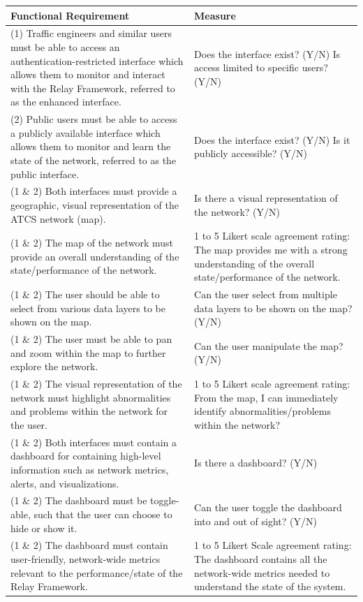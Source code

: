 \documentclass{article}
\begin{document}
\begin{longtable}[htbp!] {|p{6cm}|p{6cm}|}
\hline
\textbf{Functional Requirement} & \textbf{Measure} \\ \hline
(1) Traffic engineers and similar users must be able to access an authentication-restricted interface which allows them to monitor and interact with the Relay Framework, referred to as the enhanced interface. & Does the interface exist? (Y/N) Is access limited to specific users? (Y/N) \\ \hline
(2) Public users must be able to access a publicly available interface which allows them to monitor and learn the state of the network, referred to as the public interface. & Does the interface exist? (Y/N) Is it publicly accessible? (Y/N) \\ \hline
(1 \& 2) Both interfaces must provide a geographic, visual representation of the ATCS network (map). & Is there a visual representation of the network? (Y/N) \\ \hline
(1 \& 2) The map of the network must provide an overall understanding of the state/performance of the network. & 1 to 5 Likert scale agreement rating: The map provides me with a strong understanding of the overall state/performance of the network. \\ \hline
(1 \& 2) The user should be able to select from various data layers to be shown on the map. & Can the user select from multiple data layers to be shown on the map? (Y/N) \\ \hline
(1 \& 2) The user must be able to pan and zoom within the map to further explore the network. & Can the user manipulate the map? (Y/N) \\ \hline
(1 \& 2) The visual representation of the network must highlight abnormalities and problems within the network for the user. & 1 to 5 Likert scale agreement rating: From the map, I can immediately identify abnormalities/problems within the network? \\ \hline
(1 \& 2) Both interfaces must contain a dashboard for containing high-level information such as network metrics, alerts, and visualizations. & Is there a dashboard? (Y/N) \\ \hline
(1 \& 2) The dashboard must be toggle-able, such that the user can choose to hide or show it. & Can the user toggle the dashboard into and out of sight? (Y/N) \\ \hline
(1 \& 2) The dashboard must contain user-friendly, network-wide metrics relevant to the performance/state of the Relay Framework. & 1 to 5 Likert Scale agreement rating: The dashboard contains all the network-wide metrics needed to understand the state of the system. \\ \hline

\end{longtable}
\end{document}
